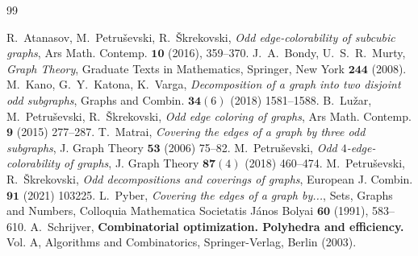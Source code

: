 \documentclass[a4paper,12pt]{article}
\numberwithin{equation}{section}
\begin{document}
\begin{thebibliography}{99}

 R.~Atanasov, M.~Petru\v{s}evski, R.~\v{S}krekovski, \textit{Odd edge-colorability of subcubic graphs}, Ars Math. Contemp. $\mathbf{10}$ (2016), 359--370.
 J.~A.~Bondy, U.~S.~R.~Murty, \textit{Graph Theory}, Graduate Texts in Mathematics, Springer, New York $\mathbf{244}$ (2008).
 M.~Kano, G.~Y.~Katona, K.~Varga, \textit{Decomposition of a graph into two disjoint odd subgraphs}, Graphs and Combin. $\mathbf{34}(6)$ (2018) 1581--1588.
 B.~Lu\v{z}ar, M.~Petru\v{s}evski, R.~\v{S}krekovski, \textit{Odd edge coloring of graphs}, Ars Math. Contemp. $\mathbf{9}$ (2015)  277--287.
 T.~Matrai, \textit{Covering the edges of a graph by three odd subgraphs}, J. Graph Theory $\mathbf{53}$ (2006) 75--82.
 M.~Petru\v{s}evski, \textit{Odd $4$-edge-colorability of graphs}, J. Graph Theory $\mathbf{87}(4)$ (2018) 460--474.
 M.~Petru\v{s}evski, R.~\v{S}krekovski, \textit{Odd decompositions and coverings of graphs}, European J. Combin. $\mathbf{91}$ (2021) 103225.
 L.~Pyber, \textit{Covering the edges of a graph by...}, Sets, Graphs and Numbers, Colloquia Mathematica Societatis J\'{a}nos Bolyai $\mathbf{60}$ (1991), 583--610.
 A.~Schrijver, \textbf{Combinatorial optimization. {P}olyhedra and efficiency.} {V}ol. {A}, Algorithms and Combinatorics, Springer-Verlag, Berlin (2003).



\end{thebibliography}
\end{document}
